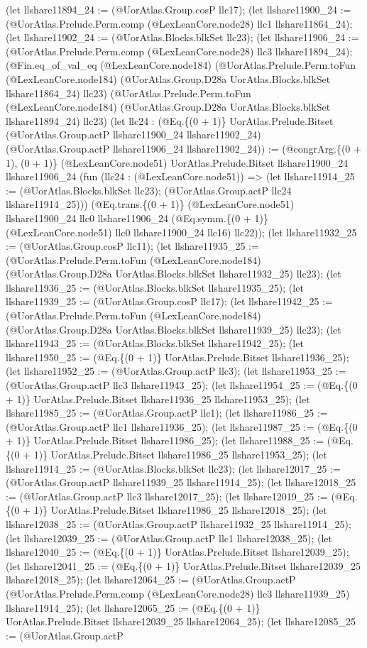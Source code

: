 \documentclass[11pt]{article}
\begin{document}
(let llshare11894\_24 := (@UorAtlas.Group.cosP llc17); (let llshare11900\_24 := (@UorAtlas.Prelude.Perm.comp (@LexLeanCore.node28) llc1 llshare11864\_24); (let llshare11902\_24 := (@UorAtlas.Blocks.blkSet llc23); (let llshare11906\_24 := (@UorAtlas.Prelude.Perm.comp (@LexLeanCore.node28) llc3 llshare11894\_24); (@Fin.eq\_of\_val\_eq (@LexLeanCore.node184) (@UorAtlas.Prelude.Perm.toFun (@LexLeanCore.node184) (@UorAtlas.Group.D28a UorAtlas.Blocks.blkSet llshare11864\_24) llc23) (@UorAtlas.Prelude.Perm.toFun (@LexLeanCore.node184) (@UorAtlas.Group.D28a UorAtlas.Blocks.blkSet llshare11894\_24) llc23) (let llc24 : (@Eq.\{(0 + 1)\} UorAtlas.Prelude.Bitset (@UorAtlas.Group.actP llshare11900\_24 llshare11902\_24) (@UorAtlas.Group.actP llshare11906\_24 llshare11902\_24)) := (@congrArg.\{(0 + 1), (0 + 1)\} (@LexLeanCore.node51) UorAtlas.Prelude.Bitset llshare11900\_24 llshare11906\_24 (fun (llc24 : (@LexLeanCore.node51)) => (let llshare11914\_25 := (@UorAtlas.Blocks.blkSet llc23); (@UorAtlas.Group.actP llc24 llshare11914\_25))) (@Eq.trans.\{(0 + 1)\} (@LexLeanCore.node51) llshare11900\_24 llc0 llshare11906\_24 (@Eq.symm.\{(0 + 1)\} (@LexLeanCore.node51) llc0 llshare11900\_24 llc16) llc22)); (let llshare11932\_25 := (@UorAtlas.Group.cosP llc11); (let llshare11935\_25 := (@UorAtlas.Prelude.Perm.toFun (@LexLeanCore.node184) (@UorAtlas.Group.D28a UorAtlas.Blocks.blkSet llshare11932\_25) llc23); (let llshare11936\_25 := (@UorAtlas.Blocks.blkSet llshare11935\_25); (let llshare11939\_25 := (@UorAtlas.Group.cosP llc17); (let llshare11942\_25 := (@UorAtlas.Prelude.Perm.toFun (@LexLeanCore.node184) (@UorAtlas.Group.D28a UorAtlas.Blocks.blkSet llshare11939\_25) llc23); (let llshare11943\_25 := (@UorAtlas.Blocks.blkSet llshare11942\_25); (let llshare11950\_25 := (@Eq.\{(0 + 1)\} UorAtlas.Prelude.Bitset llshare11936\_25); (let llshare11952\_25 := (@UorAtlas.Group.actP llc3); (let llshare11953\_25 := (@UorAtlas.Group.actP llc3 llshare11943\_25); (let llshare11954\_25 := (@Eq.\{(0 + 1)\} UorAtlas.Prelude.Bitset llshare11936\_25 llshare11953\_25); (let llshare11985\_25 := (@UorAtlas.Group.actP llc1); (let llshare11986\_25 := (@UorAtlas.Group.actP llc1 llshare11936\_25); (let llshare11987\_25 := (@Eq.\{(0 + 1)\} UorAtlas.Prelude.Bitset llshare11986\_25); (let llshare11988\_25 := (@Eq.\{(0 + 1)\} UorAtlas.Prelude.Bitset llshare11986\_25 llshare11953\_25); (let llshare11914\_25 := (@UorAtlas.Blocks.blkSet llc23); (let llshare12017\_25 := (@UorAtlas.Group.actP llshare11939\_25 llshare11914\_25); (let llshare12018\_25 := (@UorAtlas.Group.actP llc3 llshare12017\_25); (let llshare12019\_25 := (@Eq.\{(0 + 1)\} UorAtlas.Prelude.Bitset llshare11986\_25 llshare12018\_25); (let llshare12038\_25 := (@UorAtlas.Group.actP llshare11932\_25 llshare11914\_25); (let llshare12039\_25 := (@UorAtlas.Group.actP llc1 llshare12038\_25); (let llshare12040\_25 := (@Eq.\{(0 + 1)\} UorAtlas.Prelude.Bitset llshare12039\_25); (let llshare12041\_25 := (@Eq.\{(0 + 1)\} UorAtlas.Prelude.Bitset llshare12039\_25 llshare12018\_25); (let llshare12064\_25 := (@UorAtlas.Group.actP (@UorAtlas.Prelude.Perm.comp (@LexLeanCore.node28) llc3 llshare11939\_25) llshare11914\_25); (let llshare12065\_25 := (@Eq.\{(0 + 1)\} UorAtlas.Prelude.Bitset llshare12039\_25 llshare12064\_25); (let llshare12085\_25 := (@UorAtlas.Group.actP 
\end{document}
